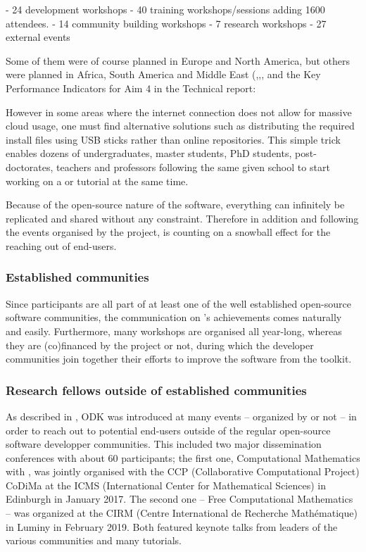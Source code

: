 \documentclass{deliverablereport}
\begin{document}
- 24 development workshops
- 40 training workshops/sessions adding 1600 attendees. 
- 14 community building workshops 
- 7 research workshops
- 27 external events 

Some of them were of course planned in Europe
and North America, but others were planned in Africa, South America
and Middle East (,,,
and the Key Performance Indicators for Aim 4 in the Technical report:

However in some areas where the internet connection does not allow for massive cloud usage, one must find alternative solutions such as distributing the required install files using USB sticks  rather than online repositories. This simple trick enables dozens of undergraduates, master students, PhD students, post-doctorates, teachers and professors following the same given school to start working on a \SageMath or \Jupyter tutorial at the same time.

Because of the open-source nature of the \ODK software, everything can infinitely be replicated and shared without any constraint. Therefore in addition and following the events organised by the project, \ODK is counting on a snowball effect for the reaching out of end-users.

\subsubsection{Established communities}

Since \ODK participants are all part of at least one of the well established open-source software communities, the communication on \ODK's achievements comes naturally and easily. Furthermore, many workshops are organised all year-long, whereas they are (co)financed by the project or not, during which the developer communities join together their efforts to improve the software from the \ODK toolkit.

\subsubsection{Research fellows outside of established communities}

As described in 
 ,
ODK was introduced at many events -- organized by \ODK or not -- in
order to reach out to potential end-users outside of the regular
open-source software developper communities. This included two major
dissemination conferences with about 60 participants; the first one,
Computational Mathematics with \Jupyter, was jointly organised with the
CCP (Collaborative Computational Project) CoDiMa at the ICMS
(International Center for Mathematical Sciences) in Edinburgh in
January 2017. The second one -- Free Computational Mathematics -- was
organized at the CIRM (Centre International de Recherche Mathématique)
in Luminy in February 2019. Both featured keynote talks from leaders
of the various communities and many tutorials.
\end{document}
